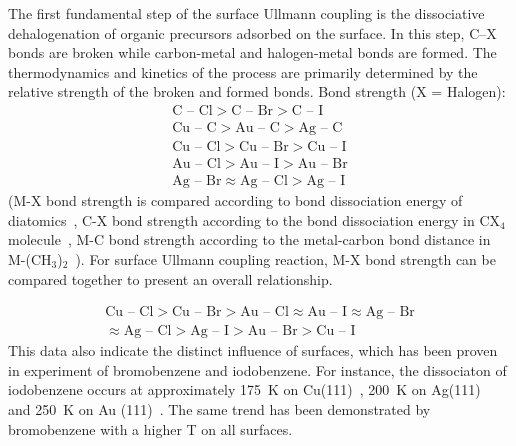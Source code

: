 \documentclass[%
 reprint,
 amsmath,amssymb,
 aps,
prb,
]{revtex4-2}
\begin{document}
The first fundamental step of the surface Ullmann coupling is the dissociative dehalogenation of organic precursors adsorbed on the surface. In this step, C--X bonds are broken while carbon-metal and halogen-metal bonds are formed. The thermodynamics and kinetics of the process are primarily determined by the relative strength of the broken and formed bonds. 
Bond strength (X = Halogen):
%
\begin{eqnarray}
\text{C -- Cl} > \text{C -- Br} > \text{C -- I} \\ 
\text{Cu -- C} > \text{Au -- C} > \text{Ag -- C} \\
\text{Cu -- Cl} > \text{Cu -- Br} > \text{Cu -- I}\\
\text{Au -- Cl} > \text{Au -- I} > \text{Au -- Br} \\
\text{Ag -- Br} \approx \text{Ag -- Cl} > \text{Ag -- I} 
\end{eqnarray}
(M-X bond strength is compared according to bond dissociation energy of diatomics~\cite{ullmann_62}, C-X bond strength according to the bond dissociation energy in CX$_4$ molecule~\cite{ullmann_63}, M-C bond strength according to the metal-carbon bond distance in M-(CH$_3$)$_2$~\cite{ullmann_61}).
For surface Ullmann coupling reaction, M-X bond strength can be compared together to present an overall relationship.

\begin{gather*}
\text{Cu -- Cl} > \text{Cu -- Br} > \text{Au -- Cl} \approx \text{Au -- I} \approx \text{Ag -- Br}\\
 \approx \text{Ag -- Cl} > \text{Ag -- I} > \text{Au -- Br} > \text{Cu -- I}
\end{gather*}
%
This data also indicate the distinct influence of surfaces, which has been proven in experiment of bromobenzene and iodobenzene. For instance, the dissociaton of iodobenzene occurs at approximately 175~K on Cu(111)~\cite{sur_sci01}, 200~K on Ag(111)~\cite{sur_sci02} and 250~K on Au (111)~\cite{sur_sci03}. The same trend has been demonstrated by bromobenzene with a higher T on all surfaces.
\end{document}
